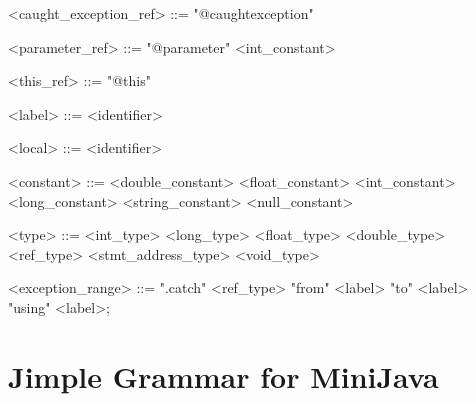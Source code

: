\documentclass{report}
\begin{document}
\begin{grammar}
<caught_exception_ref> ::= "@caughtexception"

<parameter_ref> ::= "@parameter" <int_constant>

<this_ref> ::= "@this"

<label> ::= <identifier>

<local> ::= <identifier>

<constant> ::= <double_constant> \alt <float_constant> \alt <int_constant> \alt <long_constant>  <string_constant> \alt <null_constant>

<type> ::= <int_type> \alt <long_type> \alt <float_type> \alt <double_type> \alt <ref_type> <stmt_address_type> \alt <void_type>

<exception_range> ::= ".catch" <ref_type> "from" <label> "to" <label> "using" <label>;

\end{grammar}


\section{Jimple Grammar for MiniJava}
\end{document}
